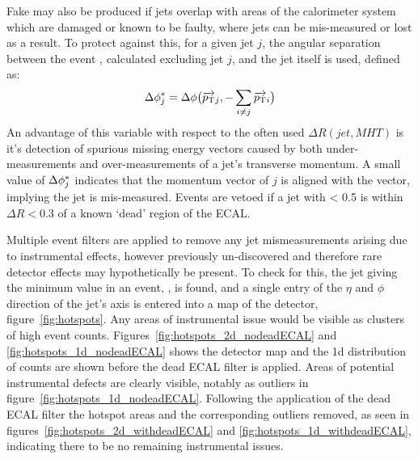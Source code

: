 Fake \mht may also be produced if jets overlap with areas of the calorimeter 
system which are damaged or known to be faulty, where jets can be mis-measured or 
lost as a result. To protect against this, for a given jet $j$, the angular separation
between the event \mht, calculated excluding jet $j$, and the jet itself is used, defined
as:
% 
\begin{equation}
\Delta \phi^*_j = \Delta \phi\big(\overrightarrow{{p_{\text T}}}_j,-\sum_{i\neq j}{\overrightarrow{{p_{\text T}}}_i}\big)
\label{eq:biasdphi}
\end{equation}
% 
An advantage of this variable with respect to the often used
$\Delta R(jet, MHT)$ is it's detection of spurious missing energy vectors caused
by both under-measurements and over-measurements of a jet's transverse momentum.
A small value of $\Delta \phi^*_j$ indicates that the momentum vector of $j$
is aligned with the \mht vector, implying the jet is mis-measured. Events are 
vetoed if a jet with \dphistar< 0.5 is within $\Delta R < 0.3$ of a known
`dead' region of the ECAL.

Multiple event filters are applied to remove any jet mismeasurements arising due
to instrumental effects, however previously un-discovered and
therefore rare detector effects may hypothetically be present. To check
for this, the
jet giving the minimum \dphistar value in an event, \mindphistar, is found,
and a single entry of the $\eta$ and $\phi$ direction of the jet's axis is entered
into a map of the detector, figure~\ref{fig:hotspots}. Any areas of instrumental issue would
be visible as clusters of high event counts. Figures~\ref{fig:hotspots_2d_nodeadECAL} and
\ref{fig:hotspots_1d_nodeadECAL} shows the detector map and the 1d distribution
of counts are shown before the dead ECAL filter is applied. Areas of
potential instrumental defects are clearly visible, notably as outliers in
figure~\ref{fig:hotspots_1d_nodeadECAL}. Following the application of the dead
ECAL filter the hotspot areas and the corresponding outliers removed, as seen in
figures~\ref{fig:hotspots_2d_withdeadECAL} and
\ref{fig:hotspots_1d_withdeadECAL}, indicating there to be no
remaining instrumental issues.


